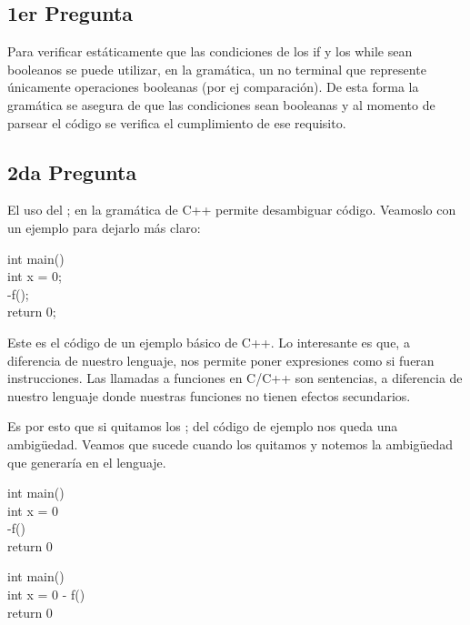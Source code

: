 \subsection{1er Pregunta}

Para verificar estáticamente que las condiciones de los if y los while sean booleanos se puede utilizar, en la gramática, un no terminal que represente únicamente operaciones booleanas (por ej comparación). De esta forma la gramática se asegura de que las condiciones sean booleanas y al momento de parsear el código se verifica el cumplimiento de ese requisito.

\subsection{2da Pregunta} El uso del ; en la gramática de C++ permite desambiguar código. Veamoslo con un ejemplo para dejarlo más claro:

\begin{algorithm} int main() { \\ int x = 0; \\ -f(); \\ return 0;\\ } \end{algorithm}
Este es el código de un ejemplo básico de C++. Lo interesante es que, a diferencia de nuestro lenguaje, nos permite poner expresiones como si fueran instrucciones. Las llamadas a funciones en C/C++ son sentencias, a diferencia de nuestro lenguaje donde nuestras funciones no tienen efectos secundarios. 

Es por esto que si quitamos los ; del código de ejemplo nos queda una ambigüedad. Veamos que sucede cuando los quitamos y notemos la ambigüedad que generaría en el lenguaje.

\begin{algorithm} int main() { \\ int x = 0 \\ -f() \\ return 0\\ } \end{algorithm} 

\begin{algorithm} int main() { \\ int x = 0 - f() \\ return 0\\ } \end{algorithm}